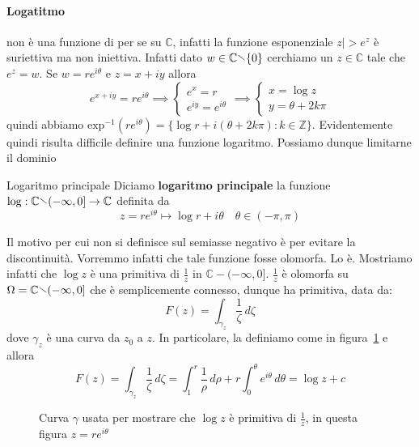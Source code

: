 \paragraph{Logatitmo} non è una funzione di per se su \(\mathbb{C}\), infatti la
funzione esponenziale \(z |> e^{z}\) è suriettiva ma non iniettiva. Infatti dato
\(w \in \mathbb{C}\sminus \{0\} \) cerchiamo un \(z \in \mathbb{C}\) tale che
\(e^{z} = w\). Se \(w = re^{i\theta}\) e \(z = x + i y\) allora
\[
      e^{x + iy} = r e ^{i\theta} \implies \begin{cases}
          e^{x} = r \\
          e^{iy} = e^{i\theta}
      \end{cases}
      \implies 
      \begin{cases}
          x = \log z\\
          y = \theta + 2k \pi
      \end{cases}
\]
quindi abbiamo \(\mathrm{exp}^{-1}{(r e^{i\theta})} = \{\log r + i{(\theta +
2k\pi)} : k \in \mathbb{Z}\}\). Evidentemente quindi risulta difficile definire
una funzione logaritmo. Possiamo dunque limitarne il dominio
\begin{definition}{Logaritmo principale}
    Diciamo \textbf{logaritmo principale} la funzione \(\log : \mathbb{C}
    \sminus (-\infty, 0] \to \mathbb{C}\) definita da
    \[
        z = r e ^{i\theta} \mapsto \log r + i\theta \quad \theta \in (-\pi,
        \pi)
    \]
\end{definition}
Il motivo per cui non si definisce sul semiasse negativo è per evitare la
discontinuità. Vorremmo infatti che tale funzione fosse olomorfa. Lo è.
Mostriamo infatti che \(\log z\) è una primitiva di \(\frac{1}{z}\) in
\(\mathbb{C} - (-\infty, 0]\). \(\frac{1}{z}\) è olomorfa su \(\Omega =
\mathbb{C} \sminus (-\infty, 0]\) che è semplicemente connesso, dunque ha
primitiva, data da:
\[
  F{(z)} = \int _{\gamma_{z} } \frac{1}{\zeta} \,d \zeta
\]
dove \(\gamma_z\) è una curva da \(z_{0}\) a \(z\). In particolare, la definiamo
come in figura~\ref{fig:log-primitiva} e allora
\[
  F{(z)} = \int _{\gamma_z} \frac{1}{\zeta} \,d \zeta = \int_{1}^{r}
  \frac{1}{\rho} \,d \rho + r\int_{0}^{\theta} e^{i\theta} \,d \theta = \log z +
  c %
\]
\begin{figure}[ht]
    \centering
    \caption{Curva \(\gamma\) usata per mostrare che \(\log z\) è primitiva di
    \(\frac{1}{z}\), in questa figura \(z = re^{i\theta}\)} 
    \label{fig:log-primitiva}
\end{figure}
